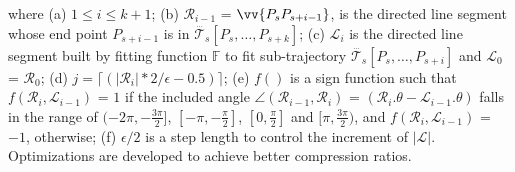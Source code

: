 \ni where (a) $1 \le i \le k+1$; (b) $\mathcal{R}_{i-1}$ = $\vv{P_sP_{s+i-1}}$, is the directed line segment whose end point $P_{s+i-1}$ is in $\dddot{\mathcal{T}_s}[P_s, \ldots, P_{s+k}]$; (c) $\mathcal{L}_{i}$ is the directed line segment built by fitting function $\mathbb{F}$ to fit sub-trajectory $\dddot{\mathcal{T}_s}[P_s, \ldots, P_{s+i}]$ and $\mathcal{L}_{0}$ = $\mathcal{R}_{0}$; (d) $j = \lceil(|\mathcal{R}_{i}|*2/\epsilon - 0.5)\rceil$; (e) $f()$ is a sign function such that $ f(\mathcal{R}_i,\mathcal{L}_{i-1})$ = $1$ if the included angle $\angle(\mathcal{R}_{i-1}, \mathcal{R}_{i})$ = $(\mathcal{R}_i.\theta - \mathcal{L}_{i-1}.\theta)$ falls in the range of $(-2\pi, -\frac{3\pi}{2}]$, $[-\pi, -\frac{\pi}{2}]$, $[0, \frac{\pi}{2}]$ and $[\pi, \frac{3\pi}{2})$, and $f(\mathcal{R}_i,\mathcal{L}_{i-1})$ = $-1$, otherwise; (f) $\epsilon/2$ is a step length to control the increment of $|\mathcal{L}|$.
%
Optimizations are developed to achieve better compression ratios.






